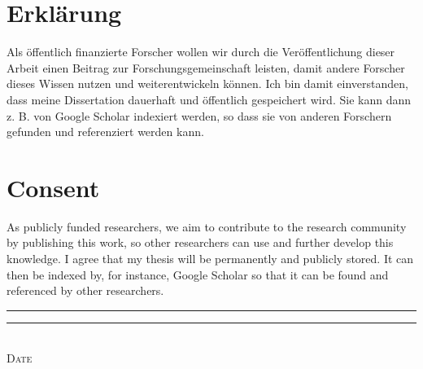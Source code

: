 \section*{Erklärung}
{
Als öffentlich finanzierte Forscher wollen wir durch die Veröffentlichung dieser Arbeit einen Beitrag zur Forschungsgemeinschaft leisten, damit andere Forscher dieses Wissen nutzen und weiterentwickeln können. Ich bin damit einverstanden, dass meine Dissertation dauerhaft und öffentlich gespeichert wird. Sie kann dann z. B. von Google Scholar indexiert werden, so dass sie von anderen Forschern gefunden und referenziert werden kann.}

\section*{Consent}
As publicly funded researchers, we aim to contribute to the research community by publishing this work, so other researchers can use and further develop this knowledge. I agree that my thesis will be permanently and publicly stored. It can then be indexed by, for instance, Google Scholar so that it can be found and referenced by other researchers.

\makeatletter
\vspace{2cm}
\rule{4cm}{0.1pt} \hfill \rule{7cm}{0.1pt} \\
\hspace*{1.5cm} \textsc{Date} \hspace*{7cm} \textsc{\@author}
\makeatother

\cleardoublepage

\pagestyle{scrheadings} %

\tableofcontents

\newpage
